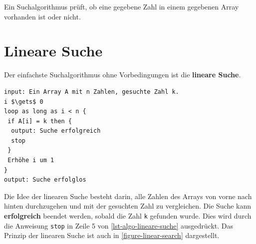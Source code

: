 \begin{definition}[Suchalgorithmus]
Ein Suchalgorithmus prüft, ob eine gegebene Zahl in einem gegebenen Array vorhanden ist oder nicht.
\end{definition}

\vspace{-0.6cm}

\section{Lineare Suche}

Der einfachste Suchalgorithmus ohne Vorbedingungen ist die \textbf{lineare Suche}.

\begin{lstlisting}[language={pseudocode}, caption={Lineare Suche.}, label={lst-algo-lineare-suche}]
input: Ein Array A mit n Zahlen, gesuchte Zahl k.
i $\gets$ 0
loop as long as i < n {
 if A[i] = k then {
  output: Suche erfolgreich
  stop
 }
 Erhöhe i um 1
}
output: Suche erfolglos
\end{lstlisting}

Die Idee der linearen Suche besteht darin, alle Zahlen des Arrays von vorne nach hinten durchzugehen und mit der gesuchten Zahl zu vergleichen. Die Suche kann \textbf{erfolgreich} beendet werden, sobald die Zahl \lstinline[language=pseudocode]{k} gefunden wurde. Dies wird durch die Anweisung \lstinline[language=pseudocode]{stop} in Zeile 5 von \autoref{lst-algo-lineare-suche} ausgedrückt. Das Prinzip der linearen Suche ist auch in \autoref{figure-linear-search} dargestellt.

